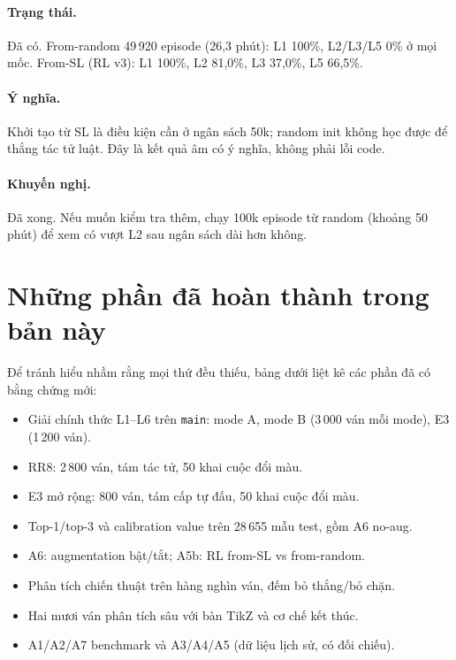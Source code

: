 \paragraph{Trạng thái.} Đã có. From-random 49\,920 episode (26,3 phút): L1 100\%, L2/L3/L5 0\%
ở mọi mốc. From-SL (RL v3): L1 100\%, L2 81,0\%, L3 37,0\%, L5 66,5\%.
\paragraph{Ý nghĩa.} Khởi tạo từ SL là điều kiện cần ở ngân sách 50k; random init không học
được để thắng tác tử luật. Đây là kết quả âm có ý nghĩa, không phải lỗi code.
\paragraph{Khuyến nghị.} Đã xong. Nếu muốn kiểm tra thêm, chạy 100k episode từ random
(khoảng 50 phút) để xem có vượt L2 sau ngân sách dài hơn không.

\section{Những phần đã hoàn thành trong bản này}
Để tránh hiểu nhầm rằng mọi thứ đều thiếu, bảng dưới liệt kê các phần đã có bằng chứng mới:
\begin{itemize}
  \item Giải chính thức L1--L6 trên \texttt{main}: mode A, mode B (3\,000 ván mỗi mode),
        E3 (1\,200 ván).
  \item RR8: 2\,800 ván, tám tác tử, 50 khai cuộc đổi màu.
  \item E3 mở rộng: 800 ván, tám cấp tự đấu, 50 khai cuộc đổi màu.
  \item Top-1/top-3 và calibration value trên 28\,655 mẫu test, gồm A6 no-aug.
  \item A6: augmentation bật/tắt; A5b: RL from-SL vs from-random.
  \item Phân tích chiến thuật trên hàng nghìn ván, đếm bỏ thắng/bỏ chặn.
  \item Hai mươi ván phân tích sâu với bàn TikZ và cơ chế kết thúc.
  \item A1/A2/A7 benchmark và A3/A4/A5 (dữ liệu lịch sử, có đối chiếu).
\end{itemize}

